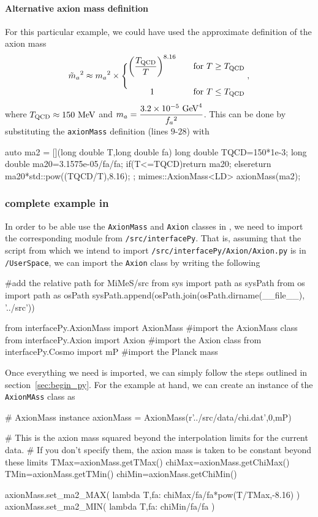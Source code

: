 \documentclass[11pt,a4paper]{article}
\begin{document}
\paragraph{Alternative axion mass definition}
%
For this particular example, we could have used the approximate definition of the axion mass
%
\begin{equation}
	\tilde m_{a}{}^2 \approx m_{a}{}^2 \times \Bigg\{ 
	\begin{matrix}
	\left( \dfrac{T_{\rm QCD}}{T} \right)^{8.16} & \quad \text{for } T\geq T_{\rm QCD} 
	\\ \\
	1 & \quad \text{for } T\leq T_{\rm QCD}
\end{matrix} \;,
	\label{eq:axM_approx}
\end{equation}
%
where $T_{\rm QCD}  \approx 150~{\rm MeV}$ and $m_{a}{}=\dfrac{3.2 \times 10^{-5} ~{\rm GeV}^4}{f_{a}{}^2}$. This can be done by substituting the {\tt axionMass} definition (lines $9$-$28$) with 
%
\begin{cpp}
	auto ma2 = [](long double T,long double fa){
	    long double TQCD=150*1e-3;
	    long double ma20=3.1575e-05/fa/fa;
	    if(T<=TQCD){return ma20;}
	    else{return ma20*std::pow((TQCD/T),8.16);}
	};
	mimes::AxionMass<LD> axionMass(ma2);
\end{cpp}


\subsubsection{complete example in \PY}
%
In order to be able use the {\tt AxionMass} and {\tt Axion} classes in \PY, we need to import the corresponding module from {\tt \mimes/src/interfacePy}. That is, assuming that the script from which we intend to import {\tt \mimes/src/interfacePy/Axion/Axion.py} is in {\tt \mimes/UserSpace}, we can import the {\tt Axion} class by writing the following
%
\begin{py}
	#add the relative path for MiMeS/src
	from sys import path as sysPath
	from os import path as osPath
	sysPath.append(osPath.join(osPath.dirname(__file__), '../src'))
	

	from interfacePy.AxionMass import AxionMass #import the AxionMass class
	from interfacePy.Axion import Axion #import the Axion class
	from interfacePy.Cosmo import mP #import the Planck mass
\end{py} 
%
Once everything we need is imported, we can simply follow the steps outlined in section~\ref{sec:begin_py}. For the example at hand, we can create an instance of the {\tt AxionMAss} class as
%
\begin{py}
	# AxionMass instance
	axionMass = AxionMass(r'../src/data/chi.dat',0,mP)
	
	# This is the axion mass squared beyond the interpolation limits for the current data. 
	# If you don't specify them, the axion mass is taken to be constant beyond these limits
	TMax=axionMass.getTMax() 
	chiMax=axionMass.getChiMax()
	TMin=axionMass.getTMin() 
	chiMin=axionMass.getChiMin()
	
	axionMass.set_ma2_MAX( lambda T,fa: chiMax/fa/fa*pow(T/TMax,-8.16) )
	axionMass.set_ma2_MIN( lambda T,fa: chiMin/fa/fa )
\end{py}
%
\end{document}
